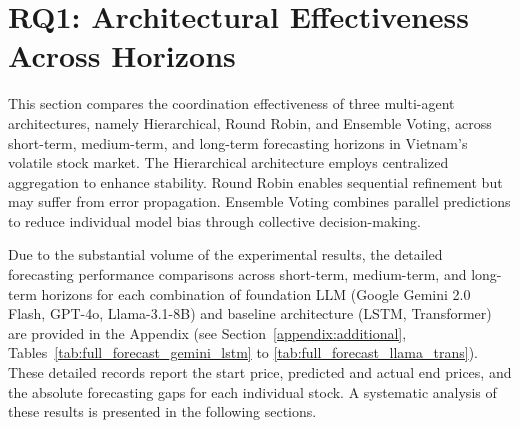\documentclass{ieeeaccess}
\begin{document}
\section{RQ1: Architectural Effectiveness Across Horizons}
This section compares the coordination effectiveness of three multi-agent architectures, namely Hierarchical, Round Robin, and Ensemble Voting, across short-term, medium-term, and long-term forecasting horizons in Vietnam’s volatile stock market. The Hierarchical architecture employs centralized aggregation to enhance stability. Round Robin enables sequential refinement but may suffer from error propagation. Ensemble Voting combines parallel predictions to reduce individual model bias through collective decision-making.

Due to the substantial volume of the experimental results, the detailed forecasting performance comparisons across short-term, medium-term, and long-term horizons for each combination of foundation LLM (Google Gemini 2.0 Flash, GPT-4o, Llama-3.1-8B) and baseline architecture (LSTM, Transformer) are provided in the Appendix (see Section~\ref{appendix:additional}, Tables~\ref{tab:full_forecast_gemini_lstm} to \ref{tab:full_forecast_llama_trans}). These detailed records report the start price, predicted and actual end prices, and the absolute forecasting gaps for each individual stock. A systematic analysis of these results is presented in the following sections.
\end{document}
